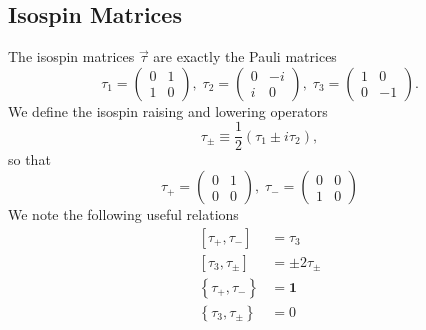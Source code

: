 \documentclass{book}[letterpaper,12pt]
\begin{document}
\subsection{Isospin Matrices}
The isospin matrices $\vec{\tau}$ are exactly the Pauli matrices
\begin{equation}
\tau_1=\left(\begin{array}{cc}
0 & 1\\
1 & 0
\end{array}\right),\;
\tau_2=\left(\begin{array}{cc}
0 & -i\\
i & 0
\end{array}\right),\;
\tau_3=\left(\begin{array}{cc}
1 & 0\\
0 & -1
\end{array}\right).
\end{equation}
We define the isospin raising and lowering operators
\begin{equation}
\tau_{\pm}\equiv \frac{1}{2}\left(\tau_1\pm i \tau_2\right),
\end{equation}
so that
\begin{equation}
\tau_+=\left(\begin{array}{cc}
0 & 1\\
0 & 0
\end{array}\right),\;\tau_- = \left(\begin{array}{cc}
0 & 0\\
1 & 0
\end{array}\right)
\end{equation}
We note the following useful relations
\begin{equation}
\begin{split}
\left[\tau_+,\tau_-\right]&=\tau_3\\
\left[\tau_3,\tau_{\pm}\right]&=\pm 2\tau_{\pm}\\
\left\{\tau_+,\tau_-\right\}&=\mathbf{1}\\
\left\{\tau_3,\tau_{\pm}\right\}&=0
\end{split}
\end{equation}
\end{document}
